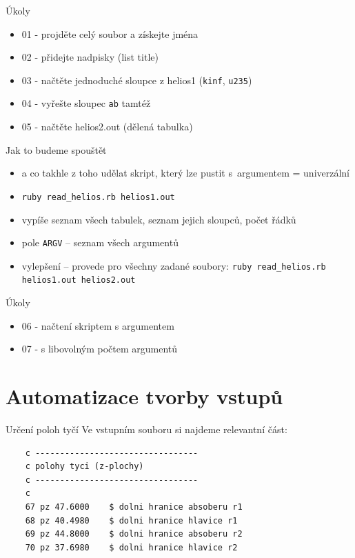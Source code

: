 \documentclass{beamer}
\begin{document}
\begin{frame}{Úkoly}
  \begin{itemize}
    \item 01 - projděte celý soubor a získejte jména
    \item 02 - přidejte nadpisky (list title)
    \item 03 - načtěte jednoduché sloupce z helios1 (\texttt{kinf}, \texttt{u235})
    \item 04 - vyřešte sloupec \texttt{ab} tamtéž 
    \item 05 - načtěte helios2.out (dělená tabulka)
  \end{itemize}
\end{frame}

\begin{frame}{Jak to budeme spouštět}
  \begin{itemize}
    \item a co takhle z toho udělat skript, který lze pustit s~argumentem = univerzální
    \item \texttt{ruby read\_helios.rb helios1.out}
    \item vypíše seznam všech tabulek, seznam jejich sloupců, počet řádků
    \item pole \texttt{ARGV} -- seznam všech argumentů
    \item vylepšení – provede pro všechny zadané soubory: \texttt{ruby read\_helios.rb helios1.out helios2.out}
  \end{itemize}
\end{frame}

\begin{frame}{Úkoly}
  \begin{itemize}
    \item 06 - načtení skriptem s argumentem
    \item 07 - s libovolným počtem argumentů
  \end{itemize}
\end{frame}

\section{Automatizace tvorby vstupů}

\begin{frame}[fragile]{Určení poloh tyčí}
  Ve vstupním souboru si najdeme relevantní část:
  \scriptsize
  \begin{verbatim}
    c ---------------------------------
    c polohy tyci (z-plochy)
    c ---------------------------------
    c
    67 pz 47.6000    $ dolni hranice absoberu r1
    68 pz 40.4980    $ dolni hranice hlavice r1
    69 pz 44.8000    $ dolni hranice absoberu r2
    70 pz 37.6980    $ dolni hranice hlavice r2
  \end{verbatim}
\end{frame}
\end{document}
